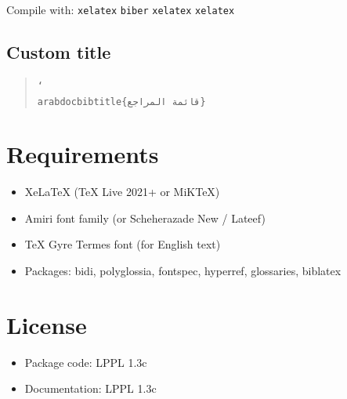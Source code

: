 \documentclass[11pt,a4paper]{ltxdoc}
\begin{document}
Compile with: \texttt{xelatex} \textrightarrow{} \texttt{biber} \textrightarrow{} \texttt{xelatex} \textrightarrow{} \texttt{xelatex}

\subsection{Custom title}

\begin{quote}
\texttt{\char`\\arabdocbibtitle\{قائمة المراجع\}}
\end{quote}

\section{Requirements}

\begin{itemize}
\item XeLaTeX (TeX Live 2021+ or MiKTeX)
\item Amiri font family (or Scheherazade New / Lateef)
\item TeX Gyre Termes font (for English text)
\item Packages: bidi, polyglossia, fontspec, hyperref, glossaries, biblatex
\end{itemize}

\section{License}

\begin{itemize}
\item Package code: LPPL 1.3c
\item Documentation: LPPL 1.3c
\end{itemize}
\end{document}
